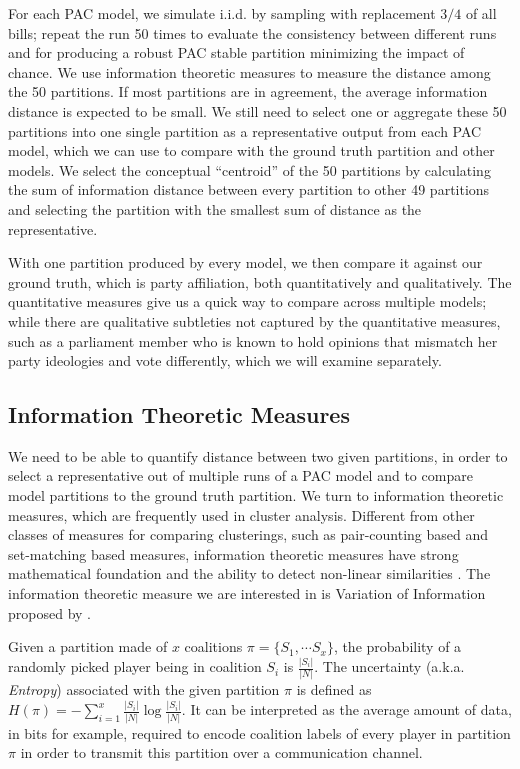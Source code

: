 For each PAC model, we simulate i.i.d. by sampling with replacement $3/4$ of
all bills; repeat the run 50 times to evaluate the consistency between
different runs and for producing a robust PAC stable partition minimizing the
impact of chance.
We use information theoretic measures to measure the distance among the 50
partitions.
If most partitions are in agreement, the average information distance is
expected to be small.
We still need to select one or aggregate these 50 partitions into one single
partition as a representative output from each PAC model, which we can use
to compare with the ground truth partition and other models.
We select the conceptual ``centroid'' of the 50 partitions by calculating
the sum of information distance between every partition to other 49 partitions
and selecting the partition with the smallest sum of distance as the
representative.

With one partition produced by every model, we then compare it against our
ground truth, which is party affiliation, both quantitatively and qualitatively.
The quantitative measures give us a quick way to compare across multiple models;
while there are qualitative subtleties not captured by the quantitative
measures, such as a parliament member who is known to hold opinions that
mismatch her party ideologies and vote differently, which we will examine
separately.

\subsection{Information Theoretic Measures}
We need to be able to quantify distance between two given partitions, in order
to select a representative out of multiple runs of a PAC model and to compare
model partitions to the ground truth partition.
We turn to information theoretic measures, which are frequently used in cluster
analysis.
Different from other classes of measures for comparing clusterings, such as
pair-counting based and set-matching based measures, information theoretic
measures have strong mathematical foundation and the ability to detect
non-linear similarities \cite{Vinh:2010:ITM:1756006.1953024}.
The information theoretic measure we are interested in is Variation of
Information proposed by .

Given a partition made of $x$ coalitions $\pi = \{S_1, \cdots S_x\}$, the
probability of a randomly picked player being in coalition $S_i$ is
$\frac{|S_i|}{|N|}$.
The uncertainty (a.k.a. \textit{Entropy}) associated with the given partition
$\pi$ is defined as
$H(\pi) = - \sum^x_{i=1} \frac{|S_i|}{|N|} \log{\frac{|S_i|}{|N|}}$.
It can be interpreted as the average amount of data, in bits for example,
required to encode coalition labels of every player in partition $\pi$ in order
to transmit this partition over a communication channel.

